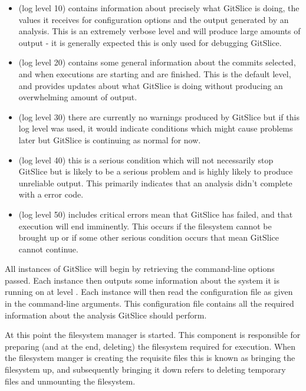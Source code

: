 \documentclass[11pt]{article}
\begin{document}
    \begin{itemize}
        \item {} (log level 10) contains information about precisely what GitSlice is doing, the values it receives for configuration options and the output generated by an analysis.
              This is an extremely verbose level and will produce large amounts of output - it is generally expected this is only used for debugging GitSlice.
        \item {} (log level 20) contains some general information about the commits selected, and when executions are starting and are finished.
              This is the default level, and provides updates about what GitSlice is doing without producing an overwhelming amount of output.
        \item {} (log level 30) there are currently no warnings produced by GitSlice but if this log level was used, it would indicate conditions which might cause problems later but GitSlice is continuing as normal for now.
        \item {} (log level 40) this is a serious condition which will not necessarily stop GitSlice but is likely to be a serious problem and is highly likely to produce unreliable output.
              This primarily indicates that an analysis didn't complete with a  error code.
        \item {} (log level 50) includes critical errors mean that GitSlice has failed, and that execution will end imminently.
              This occurs if the filesystem cannot be brought up or if some other serious condition occurs that mean GitSlice cannot continue.
    \end{itemize}

    All instances of GitSlice will begin by retrieving the command-line options passed.
    Each instance then outputs some information about the system it is running on at level .
    Each instance will then read the configuration file as given in the command-line arguments.
    This configuration file contains all the required information about the analysis GitSlice should perform.

    At this point the filesystem manager is started.
    This component is responsible for preparing (and at the end, deleting) the filesystem required for execution.
    When the filesystem manger is creating the requisite files this is known as bringing the filesystem up, and subsequently bringing it down refers to deleting temporary files and unmounting the filesystem.
\end{document}

